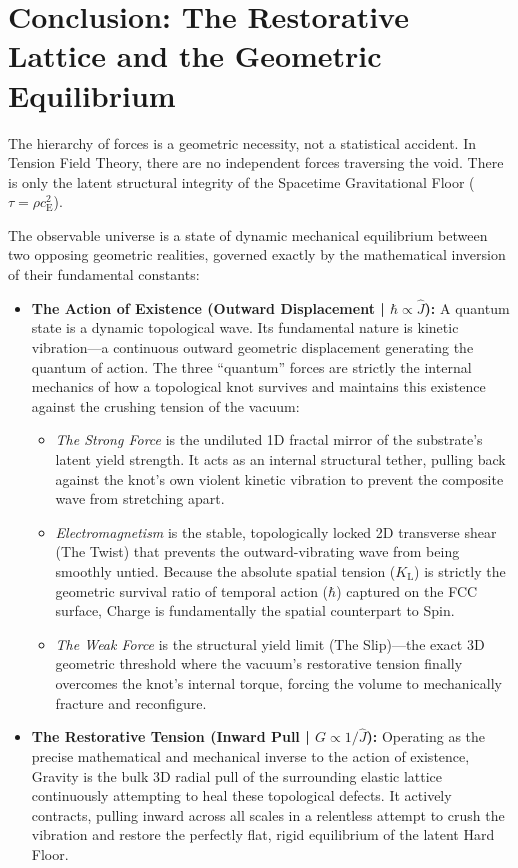 \section{Conclusion: The Restorative Lattice and the Geometric Equilibrium}
The hierarchy of forces is a geometric necessity, not a statistical accident. In Tension Field Theory, there are no independent forces traversing the void. There is only the latent structural integrity of the Spacetime Gravitational Floor ($\tau = \rho c_{\mathrm{E}}^2$).

The observable universe is a state of dynamic mechanical equilibrium between two opposing geometric realities, governed exactly by the mathematical inversion of their fundamental constants:

\begin{itemize}
    \item \textbf{The Action of Existence (Outward Displacement | $\hbar \propto \hat{J}$):} A quantum state is a dynamic topological wave. Its fundamental nature is kinetic vibration---a continuous outward geometric displacement generating the quantum of action. The three ``quantum'' forces are strictly the internal mechanics of how a topological knot survives and maintains this existence against the crushing tension of the vacuum:
    \begin{itemize}
        \item \textit{The Strong Force} is the undiluted 1D fractal mirror of the substrate's latent yield strength. It acts as an internal structural tether, pulling back against the knot's own violent kinetic vibration to prevent the composite wave from stretching apart.
        \item \textit{Electromagnetism} is the stable, topologically locked 2D transverse shear (The Twist) that prevents the outward-vibrating wave from being smoothly untied. Because the absolute spatial tension ($K_{\mathrm{L}}$) is strictly the geometric survival ratio of temporal action ($\hbar$) captured on the FCC surface, Charge is fundamentally the spatial counterpart to Spin.
        \item \textit{The Weak Force} is the structural yield limit (The Slip)---the exact 3D geometric threshold where the vacuum's restorative tension finally overcomes the knot's internal torque, forcing the volume to mechanically fracture and reconfigure.
    \end{itemize}
    \item \textbf{The Restorative Tension (Inward Pull | $G \propto 1/\hat{J}$):} Operating as the precise mathematical and mechanical inverse to the action of existence, Gravity is the bulk 3D radial pull of the surrounding elastic lattice continuously attempting to heal these topological defects. It actively contracts, pulling inward across all scales in a relentless attempt to crush the vibration and restore the perfectly flat, rigid equilibrium of the latent Hard Floor.
\end{itemize}

